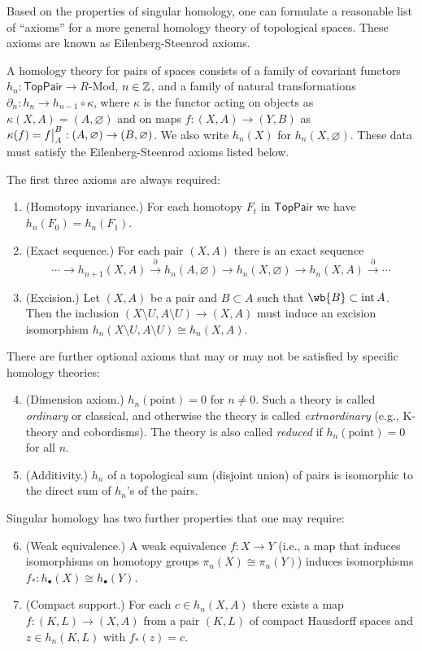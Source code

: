 Based on the properties of singular homology, one can formulate a reasonable list of ``axioms'' for a more general homology theory of topological spaces. These axioms are known as Eilenberg-Steenrod axioms.

\begin{defn}
    A homology theory for pairs of spaces consists of a family of covariant functors $h_n:\mathsf{TopPair}\to R\text{-Mod}$, $n\in\mathbb{Z}$, and a family of natural transformations $\partial_n:h_n\to h_{n-1}\circ\kappa$, where $\kappa$ is the functor acting on objects as $\kappa(X,A)=(A,\varnothing)$ and on maps $f:(X,A)\to (Y,B)$ as $\kappa(f)=\restr{f}{A}^B:(A,\varnothing)\to (B,\varnothing)$. We also write $h_n(X)$ for $h_n(X,\varnothing)$. These data must satisfy the Eilenberg-Steenrod axioms listed below.
\end{defn}

The first three axioms are always required:
\begin{enumerate}
    \item (Homotopy invariance.) For each homotopy $F_t$ in $\mathsf{TopPair}$ we have $h_n(F_0)=h_n(F_1)$.
    \item (Exact sequence.) For each pair $(X,A)$ there is an exact sequence
    \[\cdots\to h_{n+1}(X,A)\overset{\partial}\to h_n(A,\varnothing)\to h_n(X,\varnothing)\to h_n(X,A)\overset\partial\to\cdots\]
    \item (Excision.) Let $(X,A)$ be a pair and $B\subset A$ such that $\wb{B}\subset \Int A$. Then the inclusion $(X\setminus U,A\setminus U)\to (X,A)$ must induce an excision isomorphism $h_n(X\setminus U,A\setminus U)\cong h_n(X,A)$.
\end{enumerate}

There are further optional axioms that may or may not be satisfied by specific homology theories:
\begin{enumerate}
    \setcounter{enumi}{3}
    \item (Dimension axiom.) $h_n(\text{point})=0$ for $n\neq 0$. Such a theory is called \emph{ordinary} or classical, and otherwise the theory is called \emph{extraordinary} (e.g., K-theory and cobordisms). The theory is also called \emph{reduced} if $h_n(\text{point})=0$ for all $n$.
    \item (Additivity.) $h_n$ of a topological sum (disjoint union) of pairs is isomorphic to the direct sum of $h_n$'s of the pairs.
\end{enumerate}
Singular homology has two further properties that one may require:
\begin{enumerate}
    \setcounter{enumi}{5}
     \item (Weak equivalence.) A weak equivalence $f:X\to Y$ (i.e., a map that induces isomorphisms on homotopy groups $\pi_n(X)\cong \pi_n(Y)$) induces isomorphisms $f_\ast:h_\bullet(X)\cong h_\bullet(Y)$.
    \item (Compact support.)  For each $c\in h_n(X,A)$ there exists a map $f:(K,L)\to (X,A)$ from a pair $(K,L)$ of compact Hausdorff spaces and $z\in h_n(K,L)$ with $f_\ast(z)=c$.
\end{enumerate}   

